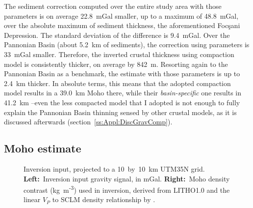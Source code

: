 The sediment correction computed over the entire study area with those parameters is on average \SI{22.8}{mGal} smaller, up to a maximum of \SI{48.8}{mGal}, over the absolute maximum of sediment thickness, the aforementioned Focşani Depression.
The standard deviation of the difference is \SI{9.4}{mGal}.
Over the Pannonian Basin (about \SI{5.2}{\kilo \metre} of sediments), the correction using \textcite{Kaban2010} parameters is \SI{33}{mGal} smaller.
Therefore, the inverted crustal thickness using \textcite{Kaban2010} compaction model is consistently thicker, on average by \SI{842}{\metre}.
Resorting again to the Pannonian Basin as a benchmark, the estimate with those parameters is up to \SI{2.4}{\kilo \metre} thicker.
In absolute terms, this means that the adopted compaction model results in a \SI{39.0}{\kilo \metre} Moho there, while their \textit{basin-specific} one results in \SI{41.2}{\kilo \metre} --even the less compacted model that I adopted is not enough to fully explain the Pannonian Basin thinning sensed by other crustal models, as it is discussed afterwards (section~\ref{ss:Appl:DiscGravComp}).

\subsection{Moho estimate}
\label{ss:Appl:DiscGravMoho}

\begin{figure}
	\begin{adjustbox}{center}
	\end{adjustbox}
	\caption[Inversion input, projected to a 10~by~\SI{10}{\kilo \metre} UTM35N grid.]{Inversion input, projected to a 10~by~\SI{10}{\kilo \metre} UTM35N grid. \textbf{Left:}~Inversion input gravity signal, in mGal. \textbf{Right:}~Moho density contrast (kg~m\textsuperscript{-3}) used in inversion, derived from {LITHO1.0} \parencite{Pasyanos2014} and the linear $V_P$ to SCLM density relationship by \textcite{Yegorova2015}.}
	\label{fig:INVinput}
\end{figure}

